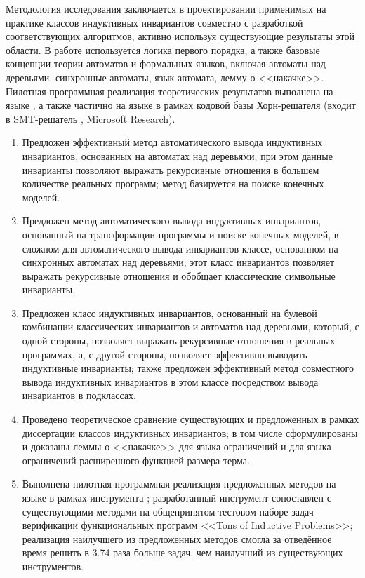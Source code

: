 {\methods}
Методология исследования заключается в проектировании применимых на практике  классов индуктивных инвариантов совместно с разработкой  соответствующих алгоритмов, активно используя существующие результаты этой области.
В работе используется  логика первого порядка, а также базовые концепции теории автоматов и формальных языков, включая автоматы над деревьями, синхронные автоматы, язык автомата, лемму о <<накачке>>.
Пилотная программная реализация теоретических результатов выполнена на языке \fsharp{}, а также частично на языке \cplusplus{} в рамках кодовой базы Хорн-решателя \racer{} (входит в SMT-решатель \zprover{}, Microsoft Research).

{}
\begin{enumerate}[beginpenalty=10000] %
  \item Предложен эффективный метод автоматического вывода индуктивных инвариантов, основанных на автоматах над деревьями; при этом данные инварианты позволяют выражать рекурсивные отношения в большем количестве реальных программ; метод базируется на поиске конечных моделей.
  \item Предложен  метод автоматического вывода индуктивных инвариантов, основанный на трансформации программы и поиске конечных моделей, в сложном для автоматического вывода инвариантов классе, основанном на синхронных автоматах над деревьями; этот класс инвариантов позволяет выражать рекурсивные отношения и обобщает классические символьные инварианты.
  \item Предложен класс индуктивных инвариантов, основанный на булевой комбинации классических инвариантов и автоматов над деревьями, который, с одной стороны, позволяет выражать рекурсивные отношения в реальных программах, а, с другой стороны, позволяет эффективно выводить индуктивные инварианты; также предложен эффективный метод совместного вывода индуктивных инвариантов в этом классе посредством вывода инвариантов в подклассах.
  \item Проведено теоретическое сравнение существующих и предложенных в рамках диссертации классов индуктивных инвариантов; в том числе сформулированы и доказаны леммы о <<накачке>> для языка ограничений и для языка ограничений расширенного функцией размера терма.
  \item Выполнена пилотная программная реализация предложенных методов на языке \fsharp{} в рамках инструмента \theringen{}; разработанный инструмент сопоставлен с существующими методами на общепринятом тестовом наборе задач верификации функциональных программ <<Tons of Inductive Problems>>; реализация наилучшего из предложенных методов смогла за отведённое время решить в 3.74 раза больше задач, чем наилучший из существующих инструментов.
\end{enumerate}

